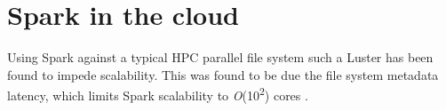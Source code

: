 \documentclass{report}
\begin{document}
	
	\section{Spark in the cloud}
	
	
	
	
	
	
	
	Using Spark against a typical HPC parallel file system such a Luster has been found to impede scalability. This was found to be due the file system metadata latency, which limits Spark scalability to \textit{O}(10\textsuperscript{2}) cores \cite{Chaimov:2016}.
	
	

	
\end{document}
